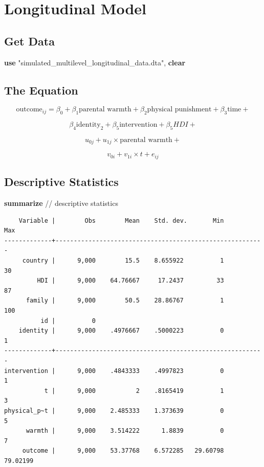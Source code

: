 \documentclass[
  letterpaper,
  DIV=11,
  numbers=noendperiod]{scrreprt}
\newenvironment{Shaded}{\begin{snugshade}}{\end{snugshade}}
\newcommand{\CommentTok}[1]{\textcolor[rgb]{0.37,0.37,0.37}{#1}}
\newcommand{\KeywordTok}[1]{\textcolor[rgb]{0.00,0.23,0.31}{\textbf{#1}}}
\newcommand{\NormalTok}[1]{\textcolor[rgb]{0.00,0.23,0.31}{#1}}
\newcommand{\StringTok}[1]{\textcolor[rgb]{0.13,0.47,0.30}{#1}}
\begin{document}
\section{Longitudinal Model}\label{longitudinal-model}

\subsection{Get Data}\label{get-data-1}

\begin{Shaded}
\begin{Highlighting}[]

\KeywordTok{use} \StringTok{"simulated\_multilevel\_longitudinal\_data.dta"}\NormalTok{, }\KeywordTok{clear}
\end{Highlighting}
\end{Shaded}

\subsection{The Equation}\label{the-equation-1}

\[\text{outcome}_{ij} = \beta_0 + \beta_1 \text{parental warmth} + \beta_2 \text{physical punishment} + \beta_3 \text{time} + \]

\[\beta_4 \text{identity}_2 + \beta_5 \text{intervention} + \beta_5 HDI +\]

\[u_{0j} + u_{1j} \times \text{parental warmth} + \]

\[v_{0i} + v_{1i} \times t + e_{ij} \]

\subsection{Descriptive Statistics}\label{descriptive-statistics-1}

\begin{Shaded}
\begin{Highlighting}[]

\KeywordTok{summarize} \CommentTok{// descriptive statistics}
\end{Highlighting}
\end{Shaded}

\begin{verbatim}
    Variable |        Obs        Mean    Std. dev.       Min        Max
-------------+---------------------------------------------------------
     country |      9,000        15.5    8.655922          1         30
         HDI |      9,000    64.76667     17.2437         33         87
      family |      9,000        50.5    28.86767          1        100
          id |          0
    identity |      9,000    .4976667    .5000223          0          1
-------------+---------------------------------------------------------
intervention |      9,000    .4843333    .4997823          0          1
           t |      9,000           2    .8165419          1          3
physical_p~t |      9,000    2.485333    1.373639          0          5
      warmth |      9,000    3.514222      1.8839          0          7
     outcome |      9,000    53.37768    6.572285   29.60798   79.02199
\end{verbatim}
\end{document}
